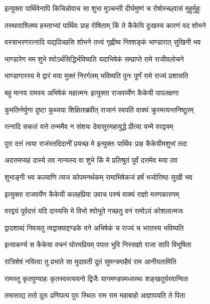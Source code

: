 \twolineshloka
{इत्युक्ता पार्थिवेनापि किचिन्नोवाच सा शुभा}
{मुञ्चन्ती दीर्घमुष्णं च रोषोस्च्छ्वासं मुहुर्मुहुः} %

\twolineshloka
{तस्थावाश्लिष्य हस्ताभ्यां पार्थिवः प्राह रोषिताम्}
{किं ते कैकेयि दुःखस्य कारणं वद शोभने} %

\twolineshloka
{वस्त्राभरणरत्नादि यद्यदिच्छसि शोभने}
{तत्त्वं गृह्णीष्व निश्शङ्कं भाण्डारात् सुखिनी भव} %

\twolineshloka
{भाण्डारेण मम शुभे श्वोऽर्थसिद्धिर्भविष्यति}
{यदाभिषेकं सम्प्राप्ते रामे राजीवलोचने} %

\twolineshloka
{भाण्डागारस्य मे द्वारं मया मुक्तं निरर्गलम्}
{भविष्यति पुनः पूर्णं रामे राज्यं प्रशासति} %

\twolineshloka
{बहु मानय रामस्य अभिषेकं महात्मनः}
{इत्युक्ता राजवर्य्येण कैकेयी पापलक्षणा} %

\twolineshloka
{कुमतिर्नर्घुणा दुष्टा कुब्जया शिक्षिताब्रवीत्}
{राजानं स्वपतिं वाक्यं क्रूरमत्यन्तनिष्ठुरम्} %

\twolineshloka
{रत्नादि सकलं यत्ते तन्ममैव न संशयः}
{देवासुरमहायुद्धे प्रीत्या यन्मे वरद्वयम्} %

\twolineshloka
{पुरा दत्तं त्वया राजंस्तदिदानीं प्रयच्छ मे}
{इत्युक्तः पार्थिवः प्राह कैकेयीमशुभां तदा} %

\twolineshloka
{अदत्तमप्यहं दास्ये तव नान्यस्य वा शुभे}
{किं मे प्रतिश्रुतं पूर्वं दत्तमेव मया तव} %

\twolineshloka
{शुभाङ्गी भव कल्याणि त्यज कोपमनर्थकम्}
{रामाभिषेकजं हर्षं भजोत्तिष्ठ सुखी भव} %

\twolineshloka
{इत्युक्ता राजवर्येण कैकेयी कलहप्रिया}
{उवाच परुषं वाक्यं राज्ञो मरणकारणम्} %

\twolineshloka
{वरद्वयं पूर्वदत्तं यदि दास्यसि मे विभो}
{श्वोभूते गच्छतु वनं रामोऽयं कोशलात्मजः} %

\twolineshloka
{द्वादशाब्दं निवसतु त्वद्वाक्याद्दण्डके वने}
{अभिषेकं च राज्यं च भरतस्य भविष्यति} %

\twolineshloka
{इत्याकर्ण्य स कैकेया वचनं घोरमप्रियम्}
{पपात भुवि निस्सज्ञो राजा सापि विभूषिता} %

\twolineshloka
{रात्रिशेषं नयित्वा तु प्रभाते सा मुदावती}
{दूतं सुमन्त्रमाहैवं राम आनीयतामिति} %

\twolineshloka
{रामस्तु कृतपुण्याहः कृतस्वस्त्ययनो द्विजैः}
{यागमण्डपमध्यस्थः शङ्खतूर्यरवान्वितः} %

\twolineshloka
{तमासाद्य ततो दूतः प्रणिपत्य पुरः स्थितः}
{राम राम महाबाहो आज्ञापयति ते पिता} %

